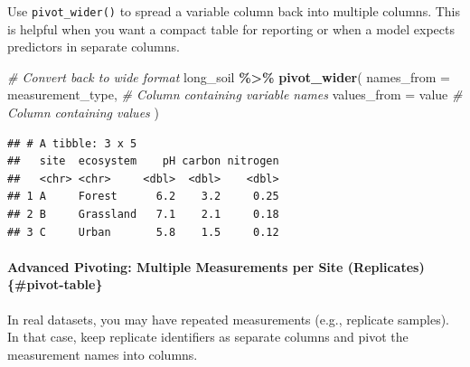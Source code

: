 \documentclass[
  10pt,
  b5paper,
  oneside]{book}
\newenvironment{Shaded}{\begin{snugshade}}{\end{snugshade}}
\newcommand{\AttributeTok}[1]{\textcolor[rgb]{0.13,0.29,0.53}{#1}}
\newcommand{\CommentTok}[1]{\textcolor[rgb]{0.56,0.35,0.01}{\textit{#1}}}
\newcommand{\FunctionTok}[1]{\textcolor[rgb]{0.13,0.29,0.53}{\textbf{#1}}}
\newcommand{\NormalTok}[1]{#1}
\newcommand{\SpecialCharTok}[1]{\textcolor[rgb]{0.81,0.36,0.00}{\textbf{#1}}}
\begin{document}
Use \texttt{pivot\_wider()} to spread a variable column back into multiple columns. This is helpful when you want a compact table for reporting or when a model expects predictors in separate columns.

\begin{Shaded}
\begin{Highlighting}[]
\CommentTok{\# Convert back to wide format}
\NormalTok{long\_soil }\SpecialCharTok{\%\textgreater{}\%}
 \FunctionTok{pivot\_wider}\NormalTok{(}
  \AttributeTok{names\_from =}\NormalTok{ measurement\_type, }\CommentTok{\# Column containing variable names}
  \AttributeTok{values\_from =}\NormalTok{ value            }\CommentTok{\# Column containing values}
\NormalTok{ )}
\end{Highlighting}
\end{Shaded}

\begin{verbatim}
## # A tibble: 3 x 5
##   site  ecosystem    pH carbon nitrogen
##   <chr> <chr>     <dbl>  <dbl>    <dbl>
## 1 A     Forest      6.2    3.2     0.25
## 2 B     Grassland   7.1    2.1     0.18
## 3 C     Urban       5.8    1.5     0.12
\end{verbatim}

\paragraph*{Advanced Pivoting: Multiple Measurements per Site (Replicates) \{\#pivot-table\}}\label{advanced-pivoting-multiple-measurements-per-site-replicates-pivot-table}

In real datasets, you may have repeated measurements (e.g., replicate samples). In that case, keep replicate identifiers as separate columns and pivot the measurement names into columns.
\end{document}
